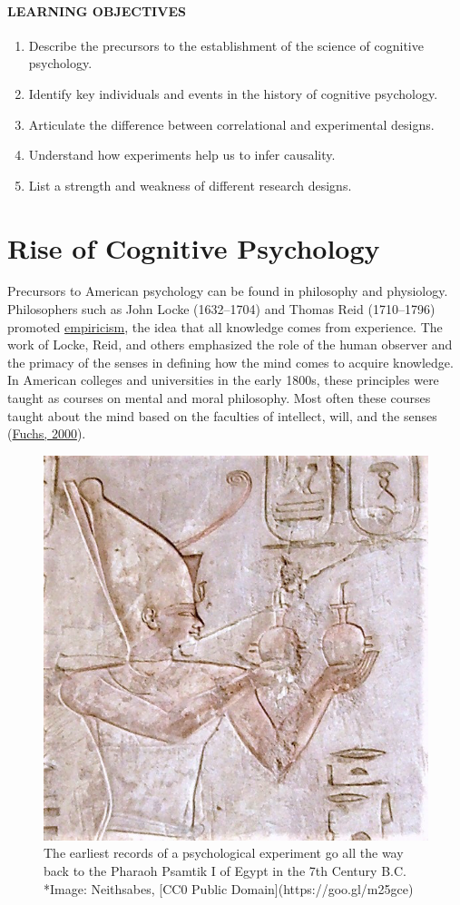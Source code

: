 \documentclass[
]{krantz}
\providecommand{\tightlist}{%
  \setlength{\itemsep}{0pt}\setlength{\parskip}{0pt}}
\begin{document}
\hypertarget{learning-objectives}{%
\paragraph*{LEARNING OBJECTIVES}\label{learning-objectives}}

\begin{enumerate}
\def\labelenumi{\arabic{enumi}.}
\tightlist
\item
  Describe the precursors to the establishment of the science of cognitive psychology.
\item
  Identify key individuals and events in the history of cognitive psychology.
\item
  Articulate the difference between correlational and experimental designs.
\item
  Understand how experiments help us to infer causality.
\item
  List a strength and weakness of different research designs.
\end{enumerate}

\hypertarget{rise-of-cognitive-psychology}{%
\section{Rise of Cognitive Psychology}\label{rise-of-cognitive-psychology}}

Precursors to American psychology can be found in philosophy and physiology. Philosophers such as John Locke (1632--1704) and Thomas Reid (1710--1796) promoted \protect\hyperlink{empiricism}{empiricism}, the idea that all knowledge comes from experience. The work of Locke, Reid, and others emphasized the role of the human observer and the primacy of the senses in defining how the mind comes to acquire knowledge. In American colleges and universities in the early 1800s, these principles were taught as courses on mental and moral philosophy. Most often these courses taught about the mind based on the faculties of intellect, will, and the senses (\protect\hyperlink{ref-fuchs2000}{Fuchs, 2000}).

\begin{figure}

{\centering \includegraphics[width=0.4\linewidth]{images/ch1/pharoah} 

}

\caption{The earliest records of a psychological experiment go all the way back to the Pharaoh Psamtik I of Egypt in the 7th Century B.C. *Image: Neithsabes, [CC0 Public Domain](https://goo.gl/m25gce)}\label{fig:pharoah}
\end{figure}
\end{document}
